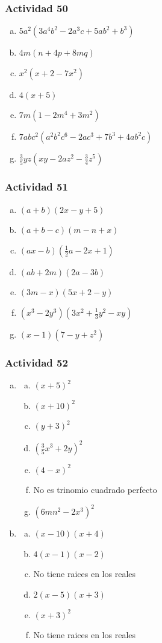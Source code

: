 \documentclass[a4paper, twocolumn]{article}
\begin{document}
\subsubsection*{Actividad 50}
\begin{enumerate}[a)]
\item $5 a^2 (3 a^4 b^2 - 2 a^3 c + 5 a b^2 + b^3)$
\item $4m(n+4p+8mq)$
\item $x^2(x+2-7x^2)$
\item $4(x+5)$
\item $7m(1-2m^4+3m^2)$
\item $7abc^2(a^2b^2c^6-2ac^3+7b^3+4ab^2c)$
\item $\frac{3}{5}yz(xy-2az^2-\frac{3}{4}z^5)$
\end{enumerate}

\subsubsection*{Actividad 51}
\begin{enumerate}[a)]

\item $(a+b)(2x-y+5)$
\item $(a+b-c)(m-n+x)$
\item $(ax-b)(\frac{1}{2}a-2x+1)$
\item $(ab+2m)(2a-3b)$
\item $(3m-x)(5x+2-y)$
\item $(x^3-2y^3)(3x^2+\frac{1}{3}y^2-xy)$
\item $(x-1)(7-y+z^2)$
\end{enumerate}

\subsubsection*{Actividad 52}
\begin{enumerate}[a)]
\item \begin{enumerate}[a)]
	\item $(x+5)^2$
	\item $(x+10)^2$
	\item $(y+3)^2$
	\item $(\frac{3}{5}x^3+2y)^2$
	\item $(4-x)^2$
	\item No es trinomio cuadrado perfecto
	\item $(6mn^2 -2x^3)^2$
	\end{enumerate}
\item \begin{enumerate}[a)]
	\item $(x-10)(x+4)$
	\item $4(x-1)(x-2)$
	\item No tiene raices en los reales
	\item $2(x-5)(x+3)$
	\item $(x+3)^2$
	\item No tiene raices en los reales
	\end{enumerate}
\end{enumerate}
\end{document}
